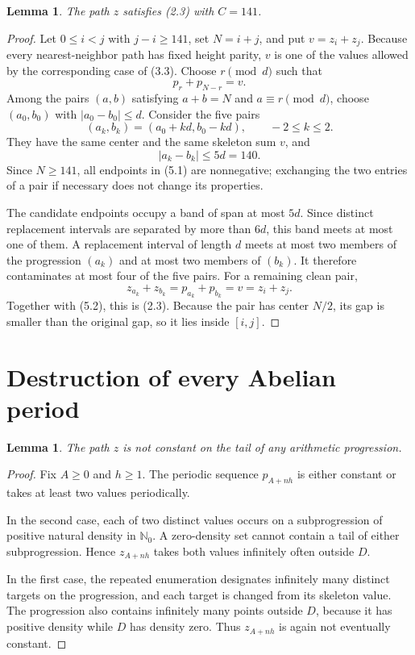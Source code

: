 \documentclass[11pt]{article}
\newtheorem{lemma}[theorem]{Lemma}
\newcommand{\N}{\mathbb N}
\begin{document}
\begin{lemma}\label{lem:preservation}
The path $z$ satisfies (2.3) with $C=141$.
\end{lemma}

\begin{proof}
Let $0\le i<j$ with $j-i\ge141$, set $N=i+j$, and put $v=z_i+z_j$.
Because every nearest-neighbor path has fixed height parity, $v$ is one of
the values allowed by the corresponding case of (3.3). Choose $r\pmod d$
such that
\[
p_r+p_{N-r}=v.
\]
Among the pairs $(a,b)$ satisfying $a+b=N$ and $a\equiv r\pmod d$, choose
$(a_0,b_0)$ with $|a_0-b_0|\le d$. Consider the five pairs
\[
(a_k,b_k)=(a_0+kd,b_0-kd),\qquad -2\le k\le2. \tag{5.1}
\]
They have the same center and the same skeleton sum $v$, and
\[
|a_k-b_k|\le5d=140. \tag{5.2}
\]
Since $N\ge141$, all endpoints in (5.1) are nonnegative; exchanging the two
entries of a pair if necessary does not change its properties.

The candidate endpoints occupy a band of span at most $5d$. Since distinct
replacement intervals are separated by more than $6d$, this band meets at
most one of them. A replacement interval of length $d$ meets at most two
members of the progression $(a_k)$ and at most two members of $(b_k)$. It
therefore contaminates at most four of the five pairs. For a remaining clean
pair,
\[
z_{a_k}+z_{b_k}=p_{a_k}+p_{b_k}=v=z_i+z_j.
\]
Together with (5.2), this is (2.3). Because the pair has center $N/2$, its
gap is smaller than the original gap, so it lies inside $[i,j]$.
\end{proof}

\section{Destruction of every Abelian period}

\begin{lemma}\label{lem:destroy}
The path $z$ is not constant on the tail of any arithmetic progression.
\end{lemma}

\begin{proof}
Fix $A\ge0$ and $h\ge1$. The periodic sequence $p_{A+nh}$ is either
constant or takes at least two values periodically.

In the second case, each of two distinct values occurs on a subprogression of
positive natural density in $\N_0$. A zero-density set cannot contain a tail
of either subprogression. Hence $z_{A+nh}$ takes both values infinitely often
outside $D$.

In the first case, the repeated enumeration designates infinitely many
distinct targets on the progression, and each target is changed from its
skeleton value. The progression also contains infinitely many points outside
$D$, because it has positive density while $D$ has density zero. Thus
$z_{A+nh}$ is again not eventually constant.
\end{proof}
\end{document}
